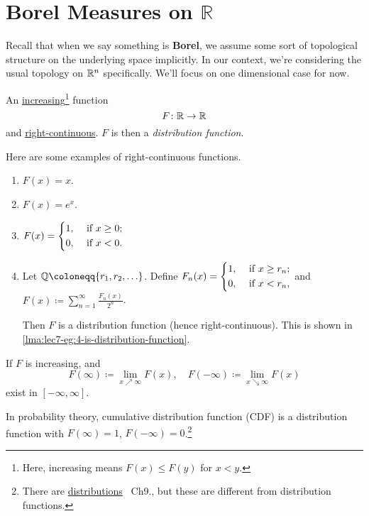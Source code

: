 \section{Borel Measures on \(\mathbb{R}\)}
\begin{prev}
	Recall that when we say something is \textbf{Borel}, we assume some sort of topological structure on the underlying space implicitly.
	In our context, we're considering the usual topology on \(\mathbb{\MakeUppercase{r}}^n \) specifically. We'll focus on one dimensional case
	for now.
\end{prev}

\begin{definition}\label{def:distribution-function}
	An \underline{increasing}\footnote{Here, increasing means \(F(x)\leq F(y)\) for \(x<y\).} function
	\[
		F\colon \mathbb{\MakeUppercase{R}} \to \mathbb{\MakeUppercase{R}}
	\]
	and \underline{right-continuous}. \(F\) is then a \emph{distribution function}.
\end{definition}

\begin{eg}
	Here are some examples of right-continuous functions.
	\begin{enumerate}[(1)]
		\item \(F(x) = x\).
		\item \(F(x) = e^x\).
		\item \(F(x) = \begin{dcases}
			      1, & \text{ if } x\geq 0; \\
			      0, & \text{ if } x < 0.
		      \end{dcases}\)
		\item \label{eg:lec7-4} Let \(\mathbb{\MakeUppercase{Q}} \coloneqq \{r_1, r_2, \ldots  \}\). Define
		      \(
		      F_n(x) = \begin{dcases}
			      1, & \text{ if } x\geq r_n; \\
			      0, & \text{ if } x < r_n,
		      \end{dcases}
		      \) and \( F(x) \coloneqq \sum\limits_{n=1}^{\infty} \frac{F_n(x)}{2^n}\).

		      Then \(F\) is a distribution function (hence right-continuous). This is shown in \autoref{lma:lec7-eg:4-is-distribution-function}.
	\end{enumerate}
\end{eg}
\begin{note}
	If \(F\) is increasing, and
	\[
		F(\infty )\coloneqq \lim\limits_{x \nearrow \infty} F(x),\quad F(-\infty ) \coloneqq \lim\limits_{x \searrow \infty} F(x)
	\]
	exist in \([-\infty , \infty ]\).

	In probability theory, cumulative distribution function (CDF) is a distribution function with \(F(\infty ) = 1\), \(F(-\infty ) = 0\).\footnote{There are \underline{distributions}~\cite{folland1999real} Ch9., but these are different from distribution functions.}
\end{note}


